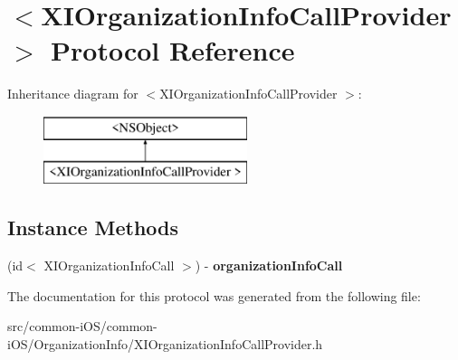 \hypertarget{protocol_x_i_organization_info_call_provider_01-p}{}\section{$<$X\+I\+Organization\+Info\+Call\+Provider $>$ Protocol Reference}
\label{protocol_x_i_organization_info_call_provider_01-p}
Inheritance diagram for $<$X\+I\+Organization\+Info\+Call\+Provider $>$\+:\begin{figure}[H]
\begin{center}
\leavevmode
\includegraphics[height=2.000000cm]{protocol_x_i_organization_info_call_provider_01-p}
\end{center}
\end{figure}
\subsection*{Instance Methods}
\begin{DoxyCompactItemize}
\item 
\hypertarget{protocol_x_i_organization_info_call_provider_01-p_ad9f4fbd7e9f5001988db8b6179312717}{}\label{protocol_x_i_organization_info_call_provider_01-p_ad9f4fbd7e9f5001988db8b6179312717} 
(id$<$ X\+I\+Organization\+Info\+Call $>$) -\/ {\bfseries organization\+Info\+Call}
\end{DoxyCompactItemize}


The documentation for this protocol was generated from the following file\+:\begin{DoxyCompactItemize}
\item 
src/common-\/i\+O\+S/common-\/i\+O\+S/\+Organization\+Info/X\+I\+Organization\+Info\+Call\+Provider.\+h\end{DoxyCompactItemize}
